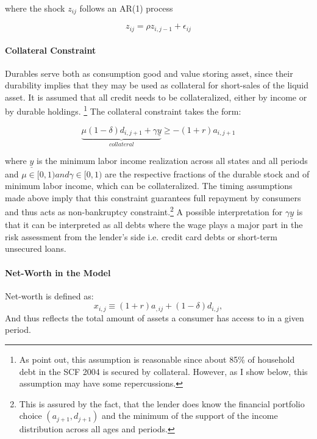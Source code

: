 \documentclass[a4paper,12pt,legno]{article}
\begin{document}
where the shock $z_{ij}$ follows an AR(1) process

\begin{equation}\label{eq:ar1_shock}
z_{ij} = \rho z_{i,j-1}+\epsilon_{ij}
\end{equation}


\paragraph{Collateral Constraint}
Durables serve both as consumption good and value storing asset, since their durability implies that they may be used as collateral for short-sales of the liquid asset. It is assumed that all credit needs to be collateralized, either by income or by durable holdings. \footnote{As \citep{hintermaier2010} point out, this assumption is reasonable since about 85\% of household debt in the SCF 2004 is secured by collateral. However, as I show below, this assumption may have some repercussions.} The collateral constraint takes the form:

\begin{equation}\label{eq:borrowing_constraint}
\underbrace{\mu(1-\delta)d_{i,j+1} + \gamma\underline{y}}_{collateral} \geq -(1+r)a_{i,j+1}
\end{equation}

where $\underline{y}$ is the minimum labor income realization across all states and all periods and $\mu \in [0,1) and \gamma \in [0,1)$ are the respective fractions of the durable stock and of minimum labor income, which can be collateralized. The timing assumptions made above imply that this constraint guarantees full repayment by consumers and thus acts as non-bankruptcy constraint.\footnote{This is assured by the fact, that the lender does know the financial portfolio choice $(a_{j+1},d_{j+1})$ and the minimum of the support of the income distribution across all ages and periods.} A possible interpretation for $\gamma\underline{y}$ is that it can be interpreted as all debts where the wage plays a major part in the risk assessment from the lender's side i.e. credit card debts or short-term unsecured loans. 


\paragraph{Net-Worth in the Model} 
Net-worth is defined as:
\begin{equation}\label{eq:net_worth}
x_{i,j} \equiv (1+r)a_{,ij} + (1-\delta)d_{i,j},
\end{equation}
And thus reflects the total amount of assets a consumer has access to in a given period.
\end{document}
